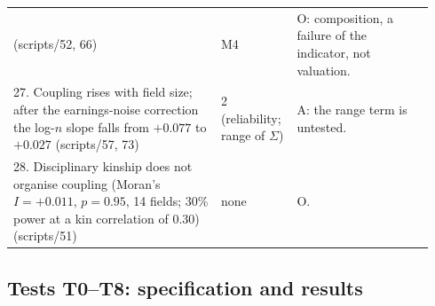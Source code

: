 \documentclass[11pt]{article}
\begin{document}
{\begin{longtable}{@{}p{0.47\linewidth}p{0.16\linewidth}p{0.31\linewidth}@{}}
(scripts/52, 66) & M4 & O: composition, a failure of the indicator, not valuation.\\
27. Coupling rises with field size; after the earnings-noise correction the log-$n$ slope falls from $+0.077$ to
$+0.027$ (scripts/57, 73) & 2 (reliability; range of $\Sigma$) & A: the range term is untested.\\
28. Disciplinary kinship does not organise coupling (Moran's $I=+0.011$, $p=0.95$, 14 fields; 30\% power at a kin
correlation of 0.30) (scripts/51) & none & O.\\
\end{longtable}
}

\subsection{Tests T0--T8: specification and results}\label{si:theory:tests}
\end{document}
